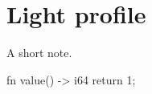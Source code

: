 \documentclass[light,oneside,openany]{on1x-book}
\begin{document}
\chapter{Light profile}
\begin{OnxNote}A short note.\end{OnxNote}
\begin{OnxCodeBlock}
fn value() -> i64 { return 1; }
\end{OnxCodeBlock}
\end{document}
